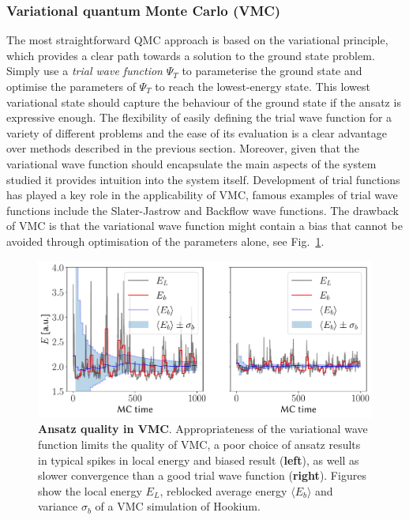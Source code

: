 \subsubsection{Variational quantum Monte Carlo (VMC)}
\label{sec:vmc}
The most straightforward QMC approach is based on the variational principle, which provides a clear path towards a solution to the ground state problem. Simply use a \emph{trial wave function} $\Psi_{T}$ to parameterise the ground state and optimise the parameters of $\Psi_{T}$ to reach the lowest-energy state. This lowest variational state should capture the behaviour of the ground state if the ansatz is expressive enough. The flexibility of easily defining the trial wave function for a variety of different problems and the ease of its evaluation is a clear advantage over methods described in the previous section. Moreover, given that the variational wave function should encapsulate the main aspects of the system studied it provides intuition into the system itself. Development of trial functions has played a key role in the applicability of VMC, famous examples of trial wave functions include the Slater-Jastrow and Backflow wave functions. The drawback of VMC is that the variational wave function might contain a bias that cannot be avoided through optimisation of the parameters alone, see Fig.~\ref{fig:qmc_blocking}. 
\begin{figure}[h]
	\centering
	\includegraphics[width=\linewidth]{Chapter2/Figs/Vector/blocking}
	\caption[Ansatz quality in VMC]{\textbf{Ansatz quality in VMC}. Appropriateness of the variational wave function limits the quality of VMC, a poor choice of ansatz results in typical spikes in local energy  and biased result (\textbf{left}), as well as slower convergence than a good trial wave function (\textbf{right}). Figures show the local energy $E_L$, reblocked average energy $\langle E_b \rangle$ and variance $\sigma_b$ of a VMC simulation of Hookium.}
	\label{fig:qmc_blocking}
\end{figure}
